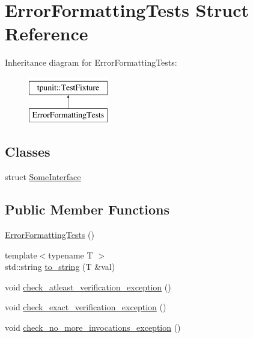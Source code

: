 \hypertarget{structErrorFormattingTests}{}\section{Error\+Formatting\+Tests Struct Reference}
\label{structErrorFormattingTests}
Inheritance diagram for Error\+Formatting\+Tests\+:\begin{figure}[H]
\begin{center}
\leavevmode
\includegraphics[height=2.000000cm]{structErrorFormattingTests}
\end{center}
\end{figure}
\subsection*{Classes}
\begin{DoxyCompactItemize}
\item 
struct \mbox{\hyperlink{structErrorFormattingTests_1_1SomeInterface}{Some\+Interface}}
\end{DoxyCompactItemize}
\subsection*{Public Member Functions}
\begin{DoxyCompactItemize}
\item 
\mbox{\hyperlink{structErrorFormattingTests_ae67d0279a069bf1a69712ca1a4c47934}{Error\+Formatting\+Tests}} ()
\item 
{\footnotesize template$<$typename T $>$ }\\std\+::string \mbox{\hyperlink{structErrorFormattingTests_adebe2df75d978e3378175b9a083d2808}{to\+\_\+string}} (T \&val)
\item 
void \mbox{\hyperlink{structErrorFormattingTests_adc0710b3f5e49e52eccbfeeb94728ffb}{check\+\_\+atleast\+\_\+verification\+\_\+exception}} ()
\item 
void \mbox{\hyperlink{structErrorFormattingTests_a3bd1f1aa2d86e5d30c05bd553b20297a}{check\+\_\+exact\+\_\+verification\+\_\+exception}} ()
\item 
void \mbox{\hyperlink{structErrorFormattingTests_ac093ee18a1e59d70196d68fa06f41347}{check\+\_\+no\+\_\+more\+\_\+invocations\+\_\+exception}} ()
\end{DoxyCompactItemize}
